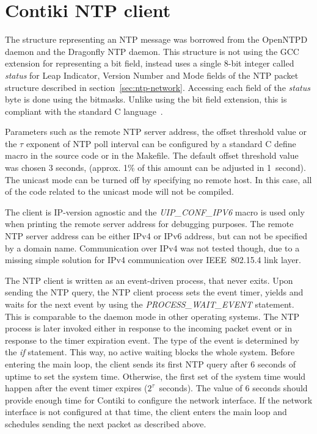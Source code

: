 
\section{Contiki NTP client}
The structure representing an NTP message was borrowed from the OpenNTPD daemon
and the Dragonfly NTP daemon.
This structure is not using the GCC extension for representing a bit field,
instead uses a single 8-bit integer called {\it{status}}
for Leap Indicator, Version Number and Mode fields of the NTP packet
structure described in section~\ref{sec:ntp-network}.
Accessing each field of the {\it{status}} byte is done using the bitmasks.
Unlike using the bit field extension,
this is compliant with the standard C language~\cite{c99}.

Parameters such as the remote NTP server address, the offset threshold value
or the $\tau$ exponent of NTP poll interval can be configured by a standard C define macro
in the source code or in the Makefile.
The default offset threshold value was chosen 3 seconds,
(approx. 1\% of this amount can be adjusted in 1~second).
The unicast mode can be turned off by specifying no remote host.
In this case, all of the code related to the unicast mode will not be compiled.

The client is IP-version agnostic and the {\it{UIP\_CONF\_IPV6}} macro is used only
when printing the remote server address for debugging purposes.
The remote NTP server address can be either IPv4 or IPv6 address,
but can not be specified by a domain name.
Communication over IPv4 was not tested though, due to a missing simple solution for
IPv4 communication over IEEE~802.15.4 link layer. %

The NTP client is written as an event-driven process, that never exits.
Upon sending the NTP query, the NTP client process sets the event timer,
yields and waits for the next event by using the {\it{PROCESS\_WAIT\_EVENT}} statement.
This is comparable to the daemon mode in other operating systems.
The NTP process is later invoked either in response to the incoming packet event
or in response to the timer expiration event.
The type of the event is determined by the {\it{if}} statement.
This way, no active waiting blocks the whole system.
Before entering the main loop, the client sends
its first NTP query after 6 seconds of uptime to set the system time.
Otherwise, the first set of the system time would happen
after the event timer expires ($2^{\tau}$~seconds).
The value of 6 seconds should provide enough time for Contiki to
configure the network interface.
If the network interface is not configured at that time,
the client enters the main loop and schedules sending the next packet as described above.

